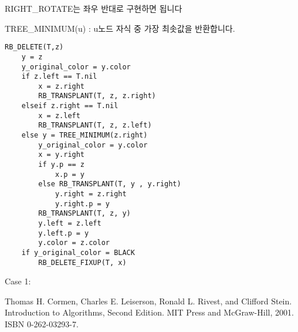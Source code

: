 \documentclass{oblivoir}
\begin{document}
RIGHT_ROTATE는 좌우 반대로 구현하면 됩니다


TREE_MINIMUM(u) : u노드 자식 중 가장 최솟값을 반환합니다.



\begin{lstlisting}[style = CStyle]
RB_DELETE(T,z)
    y = z
    y_original_color = y.color
    if z.left == T.nil
        x = z.right
        RB_TRANSPLANT(T, z, z.right)
    elseif z.right == T.nil
        x = z.left
        RB_TRANSPLANT(T, z, z.left)
    else y = TREE_MINIMUM(z.right)
        y_original_color = y.color
        x = y.right
        if y.p == z
            x.p = y
        else RB_TRANSPLANT(T, y , y.right)
            y.right = z.right
            y.right.p = y
        RB_TRANSPLANT(T, z, y)
        y.left = z.left
        y.left.p = y
        y.color = z.color
    if y_original_color = BLACK
        RB_DELETE_FIXUP(T, x)
\end{lstlisting}

Case 1:





\begin{thebibliography}{}
    Thomas H. Cormen, Charles E. Leiserson, Ronald L. Rivest, and Clifford Stein. Introduction to Algorithms, Second Edition. MIT Press and McGraw-Hill, 2001. ISBN 0-262-03293-7.
\end{thebibliography}
\end{document}
